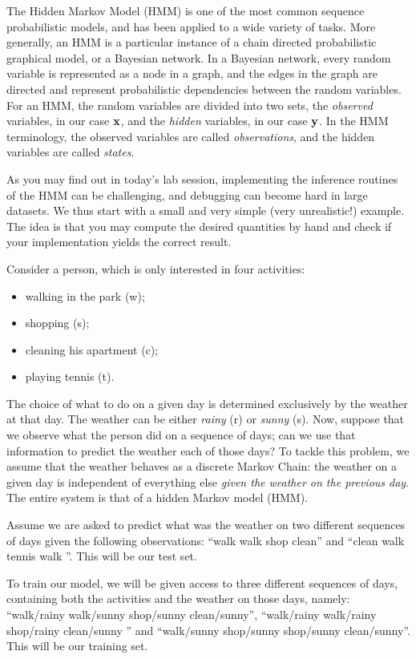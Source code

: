 
The Hidden Markov Model (HMM) is one of the most common sequence
probabilistic models, and has been applied to a wide variety of
tasks. More generally, an HMM is a particular instance of  a chain
directed probabilistic graphical model, or a Bayesian network.  In a
Bayesian network, every random variable is represented as a node in a
graph, and the edges in the graph are directed and represent
probabilistic dependencies between the random variables. For an HMM, the random variables are divided into two sets, the 
\emph{observed} variables, in our case 
$\mathbf{x}$, and the \emph{hidden} variables, in our case $\mathbf{y}$. In the HMM
terminology, the observed variables are called \emph{observations}, and the
hidden variables are called \emph{states}. 

As you may find out in today's lab session, 
implementing the inference routines of the HMM can be challenging, 
and debugging can become hard in large
datasets. We thus start with a small and very
simple (very unrealistic!) example. The idea is that you may compute the desired
quantities by hand and check if your implementation yields the correct result. 

\begin{example}

Consider a person, which is only interested in four activities: 
\begin{itemize}
\item walking in
the park (w);
\item shopping (s);
\item cleaning his apartment (c);
\item playing tennis (t).
\end{itemize}
The choice of what to do on a given day is determined exclusively by the weather at that day. The
weather can be either \emph{rainy} (r) or \emph{sunny} (s). 
Now, suppose that we observe what the person did on a sequence of days; 
can we use that information to predict the weather each of those days? 
To tackle this problem, we assume 
that the weather behaves as a discrete Markov Chain: the weather on a
given day is independent of everything else \emph{given 
the weather on the previous day}. The entire system is that of a hidden Markov model (HMM).

Assume we are asked to predict what was the weather on two different
sequences of days given the following observations: ``walk walk shop
clean''  and ``clean walk tennis walk ''. This will be our test set.


To train our model, we will be given access to three different sequences of
days, containing both the activities and the weather on those days, namely: 
``walk/rainy walk/sunny shop/sunny
clean/sunny'', ``walk/rainy walk/rainy shop/rainy clean/sunny '' and ``walk/sunny shop/sunny shop/sunny clean/sunny''. This
will be our training set.
 \end{example}

